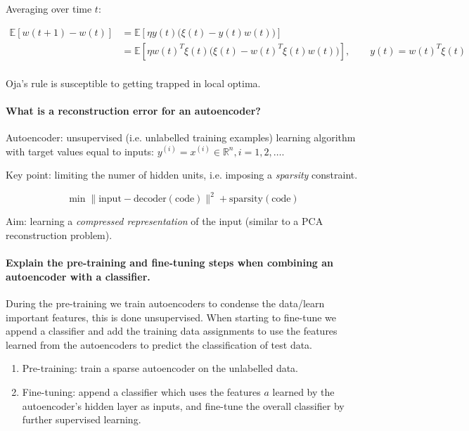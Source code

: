 Averaging over time $t$:

\begin{align*}
    \mathbb{E}[w(t+1) - w(t)] & = \mathbb{E}[ \eta y(t) \big( \xi(t) - y(t) w(t) \big) ] \\
    & = \mathbb{E}[ \eta w(t)^T \xi(t) \big( \xi(t) - w(t)^T \xi(t) w(t) \big) ], \qquad y(t) = w(t)^T \xi(t) \\
\end{align*}

Oja's rule is susceptible to getting trapped in local optima.

\paragraph{What is a reconstruction error for an autoencoder?}

Autoencoder: unsupervised (i.e. unlabelled training examples) learning algorithm with target values equal to inputs:
$y^{(i)} = x^{(i)} \in \mathbb{R}^n, i = 1, 2, \dots$.

Key point: limiting the numer of hidden units, i.e. imposing a \textit{sparsity} constraint.

$$
\min{\lVert \text{input} - \text{decoder}(\text{code}) \rVert^2 + \text{sparsity}(\text{code})}
$$

Aim: learning a \textit{compressed representation} of the input (similar to a PCA reconstruction problem).

\paragraph{Explain the pre-training and fine-tuning steps when combining an autoencoder with a classifier.}

During the pre-training we train autoencoders to condense the data/learn important features, this is
done unsupervised. When starting to fine-tune we append a classifier and add the training data
assignments to use the features learned from the autoencoders to predict the classification of test
data.

\begin{enumerate}
    \item Pre-training: train a sparse autoencoder on the unlabelled data.
    \item Fine-tuning: append a classifier which uses the features $a$ learned by the autoencoder's hidden layer as inputs, and fine-tune the overall classifier by further supervised learning.
\end{enumerate}

